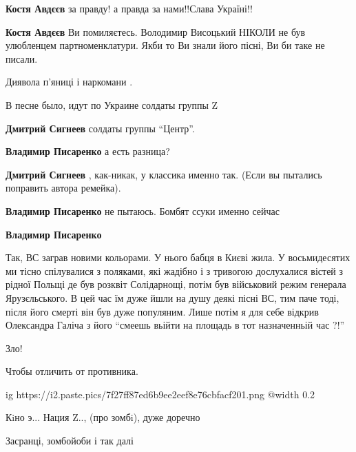 \begin{itemize}
\begin{itemize} %
\textbf{Костя Авдєєв} за правду! а правда за нами!!Слава Україні!!

\textbf{Костя Авдєєв}
Ви помиляєтесь. Володимир Висоцький НІКОЛИ не був улюбленцем партноменклатури. Якби то Ви знали його пісні, Ви би таке не писали.
\end{itemize} %

Диявола п'яниці і наркомани .

В песне было, идут по Украине солдаты группы Z

\begin{itemize} %
\textbf{Дмитрий Сигнеев} солдаты группы \enquote{Центр}.

\textbf{Владимир Писаренко} а есть разница?

\textbf{Дмитрий Сигнеев} , как-никак, у классика именно так. (Если вы пытались поправить автора ремейка).

\textbf{Владимир Писаренко} не пытаюсь. Бомбят ссуки именно сейчас

\textbf{Владимир Писаренко} 

Так, ВС заграв новими кольорами. У нього бабця в Києві жила. У восьмидесятих ми
тісно спілувалися з поляками, які жадібно і з тривогою дослухалися вістей з
рідної Польщі де був розквіт Солідарнощі, потім був військовий режим генерала
Ярузєльського. В цей час їм дуже йшли на душу деякі пісні ВС, тим паче тоді,
після його смерті він був дуже популяним. Лише потім я для себе відкрив
Олександра Галіча з його \enquote{смеешь вьійти на площадь в тот назначенньій
час ?!}

\end{itemize} %

Зло!

Чтобы отличить от противника.


\ifcmt
  ig https://i2.paste.pics/7f27ff87ed6b9ee2eef8e76cbfacf201.png
  @width 0.2
\fi


Кiно э... Нация Z.., (про зомбi), дуже доречно

Засранці, зомбойоби і так далі



\end{itemize}

